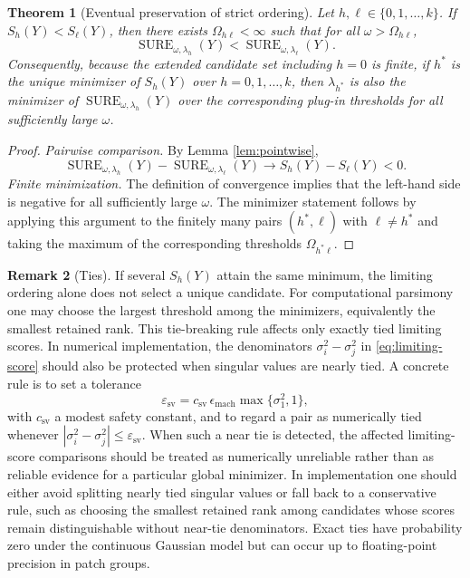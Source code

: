 \documentclass[12pt,reqno]{amsart}
\numberwithin{equation}{section}
\theoremstyle{plain}
\newtheorem{theorem}{Theorem}[section]
\theoremstyle{definition}
\newtheorem{remark}[theorem]{Remark}
\begin{document}
\begin{theorem}[Eventual preservation of strict ordering]\label{thm:ordering}
Let $h,\ell\in\{0,1,\ldots,k\}$. If $S_h(Y)<S_{\ell}(Y)$, then there exists $\Omega_{h\ell}<\infty$ such that for all $\omega>\Omega_{h\ell}$,
\begin{equation}
    \operatorname{SURE}_{\omega,\lambda_h}(Y)
    <\operatorname{SURE}_{\omega,\lambda_{\ell}}(Y).
\end{equation}
Consequently, because the extended candidate set including $h=0$ is finite, if $h^*$ is the unique minimizer of $S_h(Y)$ over $h=0,1,\ldots,k$, then $\lambda_{h^*}$ is also the minimizer of $\operatorname{SURE}_{\omega,\lambda_h}(Y)$ over the corresponding plug-in thresholds for all sufficiently large $\omega$.
\end{theorem}

\begin{proof}
\emph{Pairwise comparison.} By Lemma \ref{lem:pointwise},
\begin{equation}
    \operatorname{SURE}_{\omega,\lambda_h}(Y)-
    \operatorname{SURE}_{\omega,\lambda_{\ell}}(Y)
    \longrightarrow S_h(Y)-S_{\ell}(Y)<0.
\end{equation}
\emph{Finite minimization.} The definition of convergence implies that the left-hand side is negative for all sufficiently large $\omega$. The minimizer statement follows by applying this argument to the finitely many pairs $(h^*,\ell)$ with $\ell\neq h^*$ and taking the maximum of the corresponding thresholds $\Omega_{h^*\ell}$.
\end{proof}

\begin{remark}[Ties]
If several $S_h(Y)$ attain the same minimum, the limiting ordering alone does not select a unique candidate. For computational parsimony one may choose the largest threshold among the minimizers, equivalently the smallest retained rank. This tie-breaking rule affects only exactly tied limiting scores. In numerical implementation, the denominators $\sigma_i^2-\sigma_j^2$ in \eqref{eq:limiting-score} should also be protected when singular values are nearly tied. A concrete rule is to set a tolerance
\begin{equation}
    \varepsilon_{\mathrm{sv}}
    =c_{\mathrm{sv}}\,\epsilon_{\mathrm{mach}}\max\{\sigma_1^2,1\},
\end{equation}
with $c_{\mathrm{sv}}$ a modest safety constant, and to regard a pair as numerically tied whenever $|\sigma_i^2-\sigma_j^2|\leq\varepsilon_{\mathrm{sv}}$. When such a near tie is detected, the affected limiting-score comparisons should be treated as numerically unreliable rather than as reliable evidence for a particular global minimizer. In implementation one should either avoid splitting nearly tied singular values or fall back to a conservative rule, such as choosing the smallest retained rank among candidates whose scores remain distinguishable without near-tie denominators. Exact ties have probability zero under the continuous Gaussian model but can occur up to floating-point precision in patch groups.
\end{remark}
\end{document}
